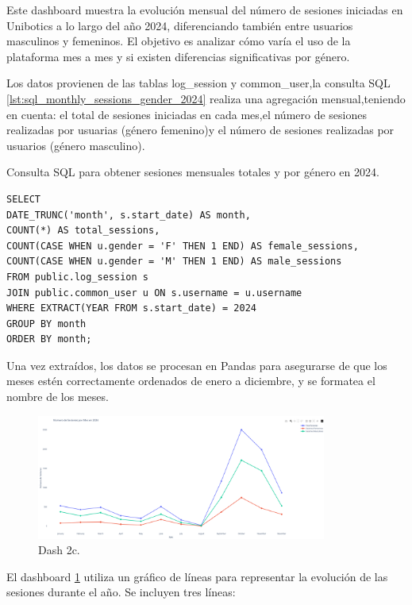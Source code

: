 \documentclass[a4paper, 12pt]{book}
\begin{document}
Este dashboard muestra la evolución mensual del número de sesiones iniciadas en Unibotics a lo largo del año 2024, diferenciando también entre usuarios masculinos y femeninos. El objetivo es analizar cómo varía el uso de la plataforma mes a mes y si existen diferencias significativas por género.

Los datos provienen de las tablas log\_session y common\_user,la consulta SQL \ref{lst:sql_monthly_sessions_gender_2024} realiza una agregación mensual,teniendo en cuenta: el total de sesiones iniciadas en cada mes,el número de sesiones realizadas por usuarias (género femenino)y el número de sesiones realizadas por usuarios (género masculino).

\begin{listing}[h!]
    \caption{Consulta SQL para obtener sesiones mensuales totales y por género en 2024.}{}
    \label{lst:sql_monthly_sessions_gender_2024}
    \begin{verbatim}
SELECT 
DATE_TRUNC('month', s.start_date) AS month,
COUNT(*) AS total_sessions,
COUNT(CASE WHEN u.gender = 'F' THEN 1 END) AS female_sessions,
COUNT(CASE WHEN u.gender = 'M' THEN 1 END) AS male_sessions
FROM public.log_session s
JOIN public.common_user u ON s.username = u.username
WHERE EXTRACT(YEAR FROM s.start_date) = 2024
GROUP BY month
ORDER BY month;
    \end{verbatim}
\end{listing}

Una vez extraídos, los datos se procesan en Pandas para asegurarse de que los meses estén correctamente ordenados de enero a diciembre, y se formatea el nombre de los meses.


\begin{figure}
  \centering
  \includegraphics[width=0.85\textwidth, keepaspectratio]{img/2c.png}
  \caption{Dash 2c.}\label{fig:2c}
\end{figure}

El dashboard \ref{fig:2c} utiliza un gráfico de líneas para representar la evolución de las sesiones durante el año. Se incluyen tres líneas:
\end{document}
